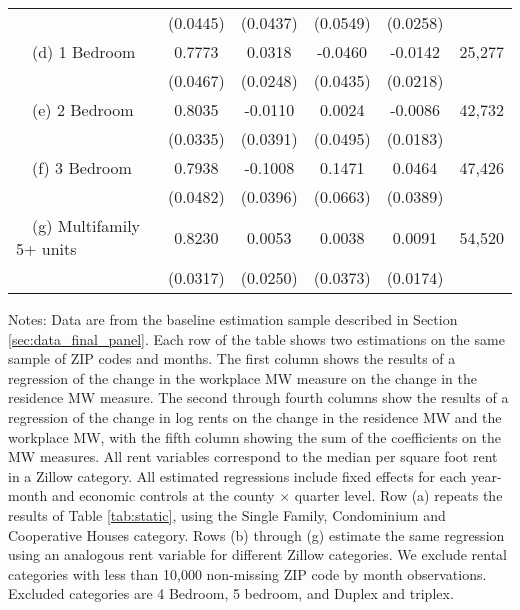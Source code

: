 \begin{landscape}
\begin{table}[ht!]
\begin{tabular}{@{}lccccc@{}}
                                                 & (0.0445) & (0.0437) & (0.0549) & (0.0258) &      \\
        $\quad$(d) 1 Bedroom                     &  0.7773  &  0.0318  &  -0.0460  &  -0.0142  & 25,277 \\
                                                 & (0.0467) & (0.0248) & (0.0435) & (0.0218) &      \\
        $\quad$(e) 2 Bedroom                     &  0.8035  &  -0.0110  &  0.0024  &  -0.0086  & 42,732 \\
                                                 & (0.0335) & (0.0391) & (0.0495) & (0.0183) &      \\
        $\quad$(f) 3 Bedroom                     &  0.7938  &  -0.1008  &  0.1471  &  0.0464  & 47,426 \\
                                                 & (0.0482) & (0.0396) & (0.0663) & (0.0389) &      \\
        $\quad$(g) Multifamily 5+ units          &  0.8230  &  0.0053  &  0.0038  &  0.0091  & 54,520 \\
                                                 & (0.0317) & (0.0250) & (0.0373) & (0.0174) &      \\ \bottomrule
    \end{tabular}

    \begin{minipage}{.95\linewidth} \footnotesize
        \vspace{2mm}
        Notes:
        Data are from the baseline estimation sample described in Section 
        \ref{sec:data_final_panel}.
        Each row of the table shows two estimations on the same sample of ZIP 
        codes and months.
        The first column shows the results of a regression of the change in the 
        workplace MW measure on the change in the residence MW measure.
        The second through fourth columns show the results of a regression of 
        the change in log rents on the change in the residence MW and the 
        workplace MW, with the fifth column showing the sum of the coefficients 
        on the MW measures.
        All rent variables correspond to the median per square foot rent in a 
        Zillow category.
        All estimated regressions include fixed effects for each year-month and 
        economic controls at the county $\times$ quarter level.
        Row (a) repeats the results of Table \ref{tab:static}, using the 
        Single Family, Condominium and Cooperative Houses category.
        Rows (b) through (g) estimate the same regression using an analogous 
        rent variable for different Zillow categories.
        We exclude rental categories with less than 10,000 non-missing ZIP code 
        by month observations.
        Excluded categories are 4 Bedroom, 5 bedroom, and Duplex and triplex.
    \end{minipage}
\end{table}
\end{landscape}
